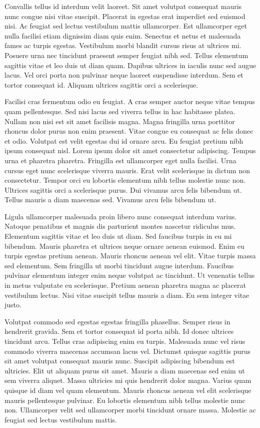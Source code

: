 \documentclass[11pt,a4paper]{article}
\begin{document}
Convallis tellus id interdum velit laoreet. Sit amet volutpat consequat mauris nunc congue nisi vitae suscipit. Placerat in egestas erat imperdiet sed euismod nisi. Ac feugiat sed lectus vestibulum mattis ullamcorper. Est ullamcorper eget nulla facilisi etiam dignissim diam quis enim. Senectus et netus et malesuada fames ac turpis egestas. Vestibulum morbi blandit cursus risus at ultrices mi. Posuere urna nec tincidunt praesent semper feugiat nibh sed. Tellus elementum sagittis vitae et leo duis ut diam quam. Dapibus ultrices in iaculis nunc sed augue lacus. Vel orci porta non pulvinar neque laoreet suspendisse interdum. Sem et tortor consequat id. Aliquam ultrices sagittis orci a scelerisque.

Facilisi cras fermentum odio eu feugiat. A cras semper auctor neque vitae tempus quam pellentesque. Sed nisi lacus sed viverra tellus in hac habitasse platea. Nullam non nisi est sit amet facilisis magna. Magna fringilla urna porttitor rhoncus dolor purus non enim praesent. Vitae congue eu consequat ac felis donec et odio. Volutpat est velit egestas dui id ornare arcu. Eu feugiat pretium nibh ipsum consequat nisl. Lorem ipsum dolor sit amet consectetur adipiscing. Tempus urna et pharetra pharetra. Fringilla est ullamcorper eget nulla facilisi. Urna cursus eget nunc scelerisque viverra mauris. Erat velit scelerisque in dictum non consectetur. Tempor orci eu lobortis elementum nibh tellus molestie nunc non. Ultrices sagittis orci a scelerisque purus. Dui vivamus arcu felis bibendum ut. Tellus mauris a diam maecenas sed. Vivamus arcu felis bibendum ut.

Ligula ullamcorper malesuada proin libero nunc consequat interdum varius. Natoque penatibus et magnis dis parturient montes nascetur ridiculus mus. Elementum sagittis vitae et leo duis ut diam. Sed faucibus turpis in eu mi bibendum. Mauris pharetra et ultrices neque ornare aenean euismod. Enim eu turpis egestas pretium aenean. Mauris rhoncus aenean vel elit. Vitae turpis massa sed elementum. Sem fringilla ut morbi tincidunt augue interdum. Faucibus pulvinar elementum integer enim neque volutpat ac tincidunt. Ut venenatis tellus in metus vulputate eu scelerisque. Pretium aenean pharetra magna ac placerat vestibulum lectus. Nisi vitae suscipit tellus mauris a diam. Eu sem integer vitae justo.

Volutpat commodo sed egestas egestas fringilla phasellus. Semper risus in hendrerit gravida. Sem et tortor consequat id porta nibh. Id donec ultrices tincidunt arcu. Tellus cras adipiscing enim eu turpis. Malesuada nunc vel risus commodo viverra maecenas accumsan lacus vel. Dictumst quisque sagittis purus sit amet volutpat consequat mauris nunc. Suscipit adipiscing bibendum est ultricies. Elit ut aliquam purus sit amet. Mauris a diam maecenas sed enim ut sem viverra aliquet. Massa ultricies mi quis hendrerit dolor magna. Varius quam quisque id diam vel quam elementum. Mauris rhoncus aenean vel elit scelerisque mauris pellentesque pulvinar. Eu lobortis elementum nibh tellus molestie nunc non. Ullamcorper velit sed ullamcorper morbi tincidunt ornare massa. Molestie ac feugiat sed lectus vestibulum mattis.
\end{document}

